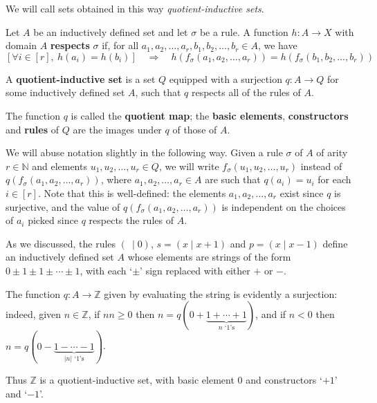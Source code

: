 We will call sets obtained in this way \textit{quotient-inductive sets}.

\begin{definition}
\label{defFunctionRespectsRule}
Let $A$ be an inductively defined set and let $\sigma$ be a rule. A function $h : A \to X$ with domain $A$ \textbf{respects} $\sigma$ if, for all $a_1,a_2,\dots,a_r,b_1,b_2,\dots,b_r \in A$, we have
\[ [\forall i \in [r],~ h(a_i) = h(b_i)] \quad \Rightarrow \quad h(f_{\sigma}(a_1,a_2,\dots,a_r)) = h(f_{\sigma}(b_1,b_2,\dots,b_r)) \]
\end{definition}


\begin{definition}
\label{defQuotientInductiveSet}
A \textbf{quotient-inductive set} is a set $Q$ equipped with a surjection $q : A \to Q$ for some inductively defined set $A$, such that $q$ respects all of the rules of $A$.

The function $q$ is called the \textbf{quotient map}; the \textbf{basic elements}, \textbf{constructors} and \textbf{rules} of $Q$ are the images under $q$ of those of $A$.
\end{definition}

We will abuse notation slightly in the following way. Given a rule $\sigma$ of $A$ of arity $r \in \mathbb{N}$ and elements $u_1,u_2,\dots,u_r \in Q$, we will write $f_{\sigma}(u_1,u_2,\dots,u_r)$ instead of $q(f_{\sigma}(a_1,a_2,\dots,a_r))$, where $a_1,a_2,\dots,a_r \in A$ are such that $q(a_i) = u_i$ for each $i \in [r]$. Note that this is well-defined: the elements $a_1,a_2,\dots,a_r$ exist since $q$ is surjective, and the value of $q(f_{\sigma}(a_1,a_2,\dots,a_r))$ is independent on the choices of $a_i$ picked since $q$ respects the rules of $A$.

\begin{example}
As we discussed, the rules $(~ \mid 0)$, $s = (x \mid x+1)$ and $p = (x \mid x-1)$ define an inductively defined set $A$ whose elements are strings of the form $0 \pm 1 \pm 1 \pm \cdots \pm 1$, with each `$\pm$' sign replaced with either $+$ or $-$.

The function $q : A \to \mathbb{Z}$ given by evaluating the string is evidently a surjection: indeed, given $n \in \mathbb{Z}$, if $n n \ge 0$ then $n = q(0+\underbrace{1+\cdots+1}_{\text{$n$ `$1$'s}})$, and if $n < 0$ then $n = q(0-\underbrace{1-\cdots-1}_{\text{$|n|$ `$1$'s}})$.

Thus $\mathbb{Z}$ is a quotient-inductive set, with basic element $0$ and constructors `$+1$' and `$-1$'.
\end{example}

